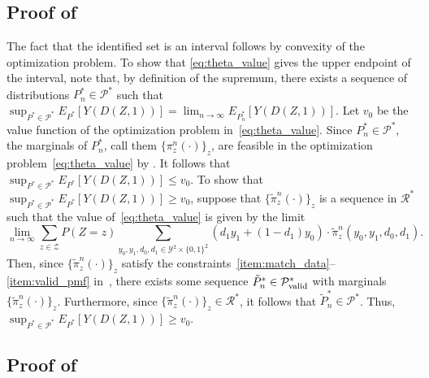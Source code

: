 \documentclass[12pt]{article}%
\theoremstyle{definition}
\newcommand\1{\operatorname{I}\indicatorfence}
\begin{document}
\begin{appendices}
\subsection{Proof of \texorpdfstring{}{Corollary~\ref{cor:optmize_over_pi}}}

The fact that the identified set is an interval follows by convexity of the
optimization problem. To show that \cref{eq:theta_value} gives the upper
endpoint of the interval, note that, by definition of the supremum, there exists
a sequence of distributions $P_{n}^{*}\in\mathcal{P}^{*}$
such that
$\sup_{P^{*}\in\mathcal{P}^{*}}E_{P^{*}}[Y(D(Z,
1))]=\lim_{n\to\infty}E_{P_{n}^{*}}[Y(D(Z, 1))]$. Let $v_{0}$ be the value
function of the optimization problem in~\eqref{eq:theta_value}. Since
$P_{n}^{*}\in\mathcal{P}^{*}$, the marginals of $P_{n}^{*}$, call them $\{\pi^{n}_{z}(\cdot)\}_{z}$, are feasible in the optimization
problem~\eqref{eq:theta_value} by . It follows that
$\sup_{P^{*}\in\mathcal{P}^{*}} E_{P^{*}}[Y(D(Z, 1))]\leq v_{0}$. To show that
$\sup_{P^{*}\in\mathcal{P}^{*}} E_{P^{*}}[Y(D(Z, 1))]\geq v_{0}$, suppose that
$\{\widetilde{\pi}^{n}_{z}(\cdot)\}_{z}$ is a sequence in $\mathcal{R}^{*}$ such
that the value of~\eqref{eq:theta_value} is given by the limit
\begin{equation*}
  \lim_{n\to\infty}\sum_{z \in \mathcal{Z}} P(Z=z) \sum_{y_{0}, y_{1}, d_{0}, d_{1} \in
    \mathcal{Y}^2 \times \{0,1\}^2} \left(d_1 y_1 + (1-d_1)y_0 \right)
  \cdot\widetilde{\pi}^{n}_{z}(y_0, y_1, d_0, d_1).
\end{equation*}
Then, since $\{\widetilde{\pi}^{n}_{z}(\cdot)\}_{z}$ satisfy the
constraints~\ref{item:match_data}--\ref{item:valid_pmf}
in~, there exists some sequence
$\tilde{P}_{n}^{*}\in\mathcal{P}^{*}_{\textnormal{valid}}$ with marginals
$\{\widetilde{\pi}^{n}_{z}(\cdot)\}_{z}$. Furthermore, since
$\{\widetilde{\pi}^{n}_{z}(\cdot)\}_{z}\in\mathcal{R}^{*}$, it follows that
$\tilde{P}_{n}^{*}\in\mathcal{P}^{*}$. Thus,
$\sup_{P^{*}\in\mathcal{P}^{*}} E_{P^{*}}[Y(D(Z, 1))]\geq v_{0}$.

\subsection{Proof of \texorpdfstring{}{Proposition~\ref{prop:monotonicity_is_not_helpful}}}


\end{appendices}
\end{document}
